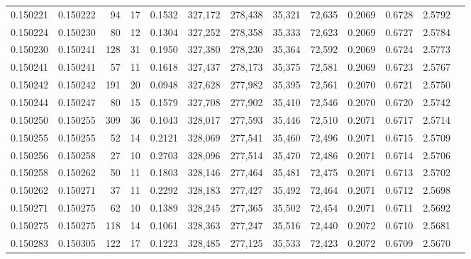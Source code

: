 \begin{tabular}{rrrrrrrrrrrrr}
0.150221 & 0.150222 &    94 &  17 &                                     0.1532 & 327,172 & 278,438 &  35,321 &  72,635 & 0.2069 & 0.6728 & 2.5792 \\
0.150224 & 0.150230 &    80 &  12 &                                     0.1304 & 327,252 & 278,358 &  35,333 &  72,623 & 0.2069 & 0.6727 & 2.5784 \\
0.150230 & 0.150241 &   128 &  31 &                                     0.1950 & 327,380 & 278,230 &  35,364 &  72,592 & 0.2069 & 0.6724 & 2.5773 \\
0.150241 & 0.150241 &    57 &  11 &                                     0.1618 & 327,437 & 278,173 &  35,375 &  72,581 & 0.2069 & 0.6723 & 2.5767 \\
0.150242 & 0.150242 &   191 &  20 &                                     0.0948 & 327,628 & 277,982 &  35,395 &  72,561 & 0.2070 & 0.6721 & 2.5750 \\
0.150244 & 0.150247 &    80 &  15 &                                     0.1579 & 327,708 & 277,902 &  35,410 &  72,546 & 0.2070 & 0.6720 & 2.5742 \\
0.150250 & 0.150255 &   309 &  36 &                                     0.1043 & 328,017 & 277,593 &  35,446 &  72,510 & 0.2071 & 0.6717 & 2.5714 \\
0.150255 & 0.150255 &    52 &  14 &                                     0.2121 & 328,069 & 277,541 &  35,460 &  72,496 & 0.2071 & 0.6715 & 2.5709 \\
0.150256 & 0.150258 &    27 &  10 &                                     0.2703 & 328,096 & 277,514 &  35,470 &  72,486 & 0.2071 & 0.6714 & 2.5706 \\
0.150258 & 0.150262 &    50 &  11 &                                     0.1803 & 328,146 & 277,464 &  35,481 &  72,475 & 0.2071 & 0.6713 & 2.5702 \\
0.150262 & 0.150271 &    37 &  11 &                                     0.2292 & 328,183 & 277,427 &  35,492 &  72,464 & 0.2071 & 0.6712 & 2.5698 \\
0.150271 & 0.150275 &    62 &  10 &                                     0.1389 & 328,245 & 277,365 &  35,502 &  72,454 & 0.2071 & 0.6711 & 2.5692 \\
0.150275 & 0.150275 &   118 &  14 &                                     0.1061 & 328,363 & 277,247 &  35,516 &  72,440 & 0.2072 & 0.6710 & 2.5681 \\
0.150283 & 0.150305 &   122 &  17 &                                     0.1223 & 328,485 & 277,125 &  35,533 &  72,423 & 0.2072 & 0.6709 & 2.5670 \\

\end{tabular}

